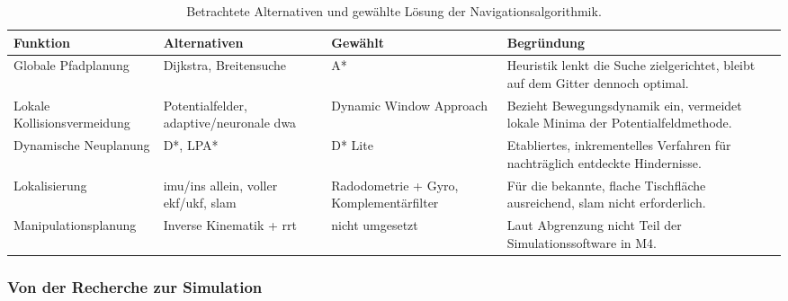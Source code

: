 \begin{table}[H]
\centering
\footnotesize
\caption{Betrachtete Alternativen und gewählte Lösung der Navigationsalgorithmik.}
\label{tab:algorithmik-auswahl}
\begin{tabularx}{\textwidth}{@{}>{\raggedright\arraybackslash}p{2.6cm}>{\raggedright\arraybackslash}p{3.1cm}>{\raggedright\arraybackslash}p{2.3cm}X@{}}
\toprule
\textbf{Funktion} & \textbf{Alternativen} & \textbf{Gewählt} & \textbf{Begründung}\\
\midrule
Globale Pfadplanung & Dijkstra, Breitensuche & A* &
Heuristik lenkt die Suche zielgerichtet, bleibt auf dem Gitter dennoch optimal.\\
\midrule
Lokale Kollisionsvermeidung & Potentialfelder, adaptive/neuronale \acrshort{dwa} & Dynamic Window Approach &
Bezieht Bewegungsdynamik ein, vermeidet lokale Minima der Potentialfeldmethode.\\
\midrule
Dynamische Neuplanung & D*, LPA* & D* Lite &
Etabliertes, inkrementelles Verfahren für nachträglich entdeckte Hindernisse.\\
\midrule
Lokalisierung & \acrshort{imu}/\acrshort{ins} allein, voller \acrshort{ekf}/\acrshort{ukf}, \acrshort{slam} & Radodometrie + Gyro, Komplementärfilter &
Für die bekannte, flache Tischfläche ausreichend, \acrshort{slam} nicht erforderlich.\\
\midrule
Manipulations\-planung & Inverse Kinematik + \acrshort{rrt} & nicht umgesetzt &
Laut Abgrenzung nicht Teil der Simulationssoftware in M4.\\
\bottomrule
\end{tabularx}
\end{table}

\subsubsection*{Von der Recherche zur Simulation}

